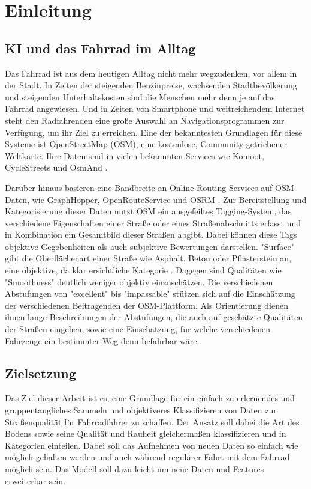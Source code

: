 \chapter{Einleitung}
\section{KI und das Fahrrad im Alltag}
\label{ch:intro}
Das Fahrrad ist aus dem heutigen Alltag nicht mehr wegzudenken, vor allem in der Stadt. In Zeiten der steigenden Benzinpreise, wachsenden Stadtbevölkerung und steigenden Unterhaltskosten sind die Menschen mehr denn je auf das Fahrrad angewiesen. Und in Zeiten von Smartphone und weitreichendem Internet steht den Radfahrenden eine große Auswahl an Navigationsprogrammen zur Verfügung, um ihr Ziel zu erreichen. Eine der bekanntesten Grundlagen für diese Systeme ist OpenStreetMap (OSM), eine kostenlose, Community-getriebener Weltkarte. Ihre Daten sind in vielen bekannnten Services wie Komoot, CycleStreets und OsmAnd \cite{OsmAndroidWiki2026}. 

Darüber hinaus basieren eine Bandbreite an Online-Routing-Services auf OSM-Daten, wie GraphHopper, OpenRouteService und OSRM \cite{OsmRoutingWiki2026}. Zur Bereitstellung und Kategorisierung dieser Daten nutzt OSM ein ausgefeiltes Tagging-System, das verschiedene Eigenschaften einer Straße oder eines Straßenabschnitts erfasst und in Kombination ein Gesamtbild dieser Straßen abgibt. Dabei können diese Tags objektive Gegebenheiten als auch subjektive Bewertungen darstellen. "Surface" gibt die Oberflächenart einer Straße wie Asphalt, Beton oder Pflasterstein an, eine objektive, da klar ersichtliche Kategorie \cite{OsmSurfaceWiki2026}. Dagegen sind Qualitäten wie "Smoothness" deutlich weniger objektiv einzuschätzen. Die verschiedenen Abstufungen von "excellent" bis "impassable" stützen sich auf die Einschätzung der verschiedenen Beitragenden der OSM-Plattform. Als Orientierung dienen ihnen lange Beschreibungen der Abstufungen, die auch auf geschätzte Qualitäten der Straßen eingehen, sowie eine Einschätzung, für welche verschiedenen Fahrzeuge ein bestimmter Weg denn befahrbar wäre \cite{OsmSmoothnessWiki2026}.




\section{Zielsetzung}

Das Ziel dieser Arbeit ist es, eine Grundlage für ein einfach zu erlernendes und gruppentaugliches Sammeln und objektiveres Klassifizieren von Daten zur Straßenqualität für Fahrradfahrer zu schaffen. Der Ansatz soll dabei die Art des Bodens sowie seine Qualität und Rauheit gleichermaßen klassifizieren und in Kategorien einteilen. Dabei soll das Aufnehmen von neuen Daten so einfach wie möglich gehalten werden und auch während regulärer Fahrt mit dem Fahrrad möglich sein. Das Modell soll dazu leicht um neue Daten und Features erweiterbar sein.